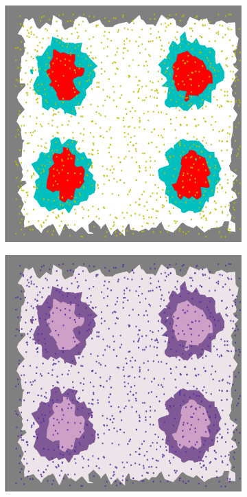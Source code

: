 \begin{description}
        \begin{figure}
            \centering
            \begin{subfigure}[t]{0.2\textwidth}
                 \centering
                 \includegraphics[width = \textwidth]{images/nuclei_mask}
                 \label{fig:nuclei_mask}
            \end{subfigure}
            \quad
            \begin{subfigure}[t]{0.2\textwidth}
                 \centering
                 \includegraphics[width = \textwidth]{images/nuclei_real}

\end{subfigure}
\end{figure}
\end{description}
